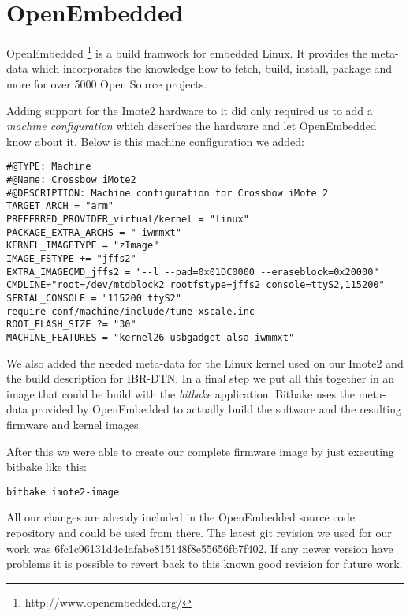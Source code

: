 \chapter{OpenEmbedded}
\label{annexoe}

OpenEmbedded \footnote{http://www.openembedded.org/} is a build framwork for
embedded Linux. It provides the meta-data which incorporates the knowledge how
to fetch, build, install, package and more for over 5000 Open Source projects.

Adding support for the Imote2 hardware to it did only required us to add a
\emph{machine configuration} which describes the hardware and let OpenEmbedded
know about it. Below is this machine configuration we added:

\begin{verbatim}
#@TYPE: Machine
#@Name: Crossbow iMote2
#@DESCRIPTION: Machine configuration for Crossbow iMote 2
TARGET_ARCH = "arm"
PREFERRED_PROVIDER_virtual/kernel = "linux"
PACKAGE_EXTRA_ARCHS = " iwmmxt"
KERNEL_IMAGETYPE = "zImage"
IMAGE_FSTYPE += "jffs2"
EXTRA_IMAGECMD_jffs2 = "--l --pad=0x01DC0000 --eraseblock=0x20000"
CMDLINE="root=/dev/mtdblock2 rootfstype=jffs2 console=ttyS2,115200"
SERIAL_CONSOLE = "115200 ttyS2"
require conf/machine/include/tune-xscale.inc
ROOT_FLASH_SIZE ?= "30"
MACHINE_FEATURES = "kernel26 usbgadget alsa iwmmxt"
\end{verbatim}

We also added the needed meta-data for the Linux kernel used on our Imote2 and
the build description for IBR-DTN. In a final step we put all this together in
an image that could be build with the \emph{bitbake} application. Bitbake uses
the meta-data provided by OpenEmbedded to actually build the software and the
resulting firmware and kernel images.

After this we were able to create our complete firmware image by just executing
bitbake like this:

\begin{verbatim}
bitbake imote2-image
\end{verbatim}

All our changes are already included in the OpenEmbedded source code repository
and could be used from there. The latest git revision we used for our work was
6fc1c96131d4c4afabe815148f8e55656fb7f402. If any newer version have problems it
is possible to revert back to this known good revision for future work.
